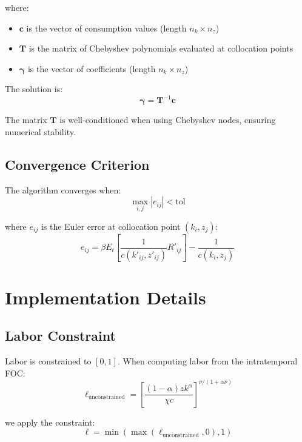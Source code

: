 \documentclass[11pt]{article}
\theoremstyle{definition}
\begin{document}
where:
\begin{itemize}[leftmargin=*, itemsep=0.1em]
\item $\mathbf{c}$ is the vector of consumption values (length $n_k \times n_z$)
\item $\mathbf{T}$ is the matrix of Chebyshev polynomials evaluated at collocation points
\item $\boldsymbol{\gamma}$ is the vector of coefficients (length $n_k \times n_z$)
\end{itemize}

The solution is:
\begin{equation}
\boldsymbol{\gamma} = \mathbf{T}^{-1} \mathbf{c}
\end{equation}

The matrix $\mathbf{T}$ is well-conditioned when using Chebyshev nodes, ensuring numerical stability.

\subsection{Convergence Criterion}

The algorithm converges when:
\begin{equation}
\max_{i,j} |e_{ij}| < \text{tol}
\end{equation}

where $e_{ij}$ is the Euler error at collocation point $(k_i, z_j)$:
\begin{equation}
e_{ij} = \beta E_t \left[ \frac{1}{c(k'_{ij}, z'_{ij})} R'_{ij} \right] - \frac{1}{c(k_i, z_j)}
\end{equation}

\section{Implementation Details}

\subsection{Labor Constraint}

Labor is constrained to $[0, 1]$. When computing labor from the intratemporal FOC:
\begin{equation}
\ell_{\text{unconstrained}} = \left[ \frac{(1-\alpha) z k^{\alpha}}{\chi c} \right]^{\nu/(1 + \alpha\nu)}
\end{equation}

we apply the constraint:
\begin{equation}
\ell = \min(\max(\ell_{\text{unconstrained}}, 0), 1)
\end{equation}
\end{document}
